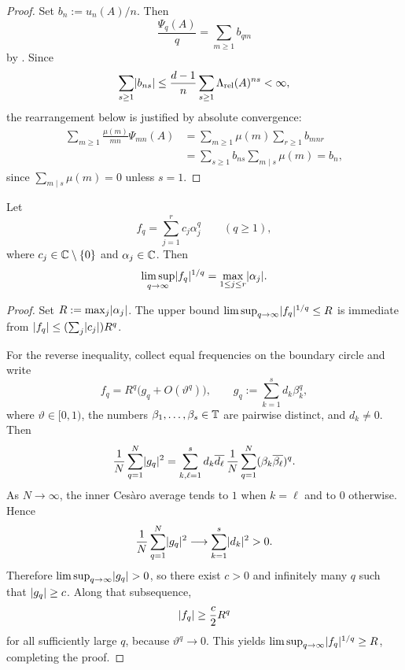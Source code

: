 \begin{proof}
  Set \(b_n:=u_n(A)/n\). Then
  \[
    \frac{\Psi_q(A)}{q}
    =\sum_{m\ge 1}b_{qm}
  \]
  by . Since
  \[
    \sum_{s\ge 1}\lvert b_{ns} \rvert
    \le \frac{d-1}{n}\sum_{s\ge 1}\Lambda_{\mathrm{rel}}(A)^{ns}
    <\infty,
  \]
  the rearrangement below is justified by absolute convergence:
  \begin{align*}
    \sum_{m\ge 1}\frac{\mu(m)}{mn}\Psi_{mn}(A)
    &=
    \sum_{m\ge 1}\mu(m)\sum_{r\ge 1}b_{mnr} \\
    &=
    \sum_{s\ge 1}b_{ns}\sum_{m\mid s}\mu(m)
    =b_n,
  \end{align*}
  since \(\sum_{m\mid s}\mu(m)=0\) unless \(s=1\).
\end{proof}

\begin{lemma}
  \label{lem:finite-part-exponential-sum-limsup}
  Let
  \[
    f_q=\sum_{j=1}^r c_j\alpha_j^q
    \qquad (q\ge 1),
  \]
  where \(c_j\in\mathbb{C}\setminus\{0\}\) and \(\alpha_j\in\mathbb{C}\). Then
  \[
    \limsup_{q\to\infty}\lvert f_q \rvert^{1/q}
    =\max_{1\le j\le r}\lvert \alpha_j \rvert.
  \]
\end{lemma}

\begin{proof}
  Set \(R:=\max_j\lvert \alpha_j \rvert\). The upper bound
  \(\limsup_{q\to\infty}\lvert f_q \rvert^{1/q}\le R\) is immediate from
  \(\lvert f_q \rvert\le (\sum_j\lvert c_j \rvert)R^q\).

  For the reverse inequality, collect equal frequencies on the boundary
  circle and write
  \[
    f_q
    =R^q\bigl(g_q+O(\vartheta^q)\bigr),
    \qquad
    g_q:=\sum_{k=1}^s d_k\beta_k^q,
  \]
  where \(\vartheta\in[0,1)\), the numbers \(\beta_1,\dots,\beta_s\in\mathbb{T}\)
  are pairwise distinct, and \(d_k\neq 0\). Then
  \[
    \frac{1}{N}\sum_{q=1}^N\lvert g_q \rvert^2
    =\sum_{k,\ell=1}^s d_k\overline{d_\ell}\,
      \frac{1}{N}\sum_{q=1}^N(\beta_k\overline{\beta_\ell})^q.
  \]
  As \(N\to\infty\), the inner Ces\`aro average tends to \(1\) when
  \(k=\ell\) and to \(0\) otherwise. Hence
  \[
    \frac{1}{N}\sum_{q=1}^N\lvert g_q \rvert^2
    \longrightarrow
    \sum_{k=1}^s\lvert d_k \rvert^2>0.
  \]
  Therefore \(\limsup_{q\to\infty}\lvert g_q \rvert>0\), so there exist
  \(c>0\) and infinitely many \(q\) such that \(\lvert g_q \rvert\ge c\). Along
  that subsequence,
  \[
    \lvert f_q \rvert\ge \frac{c}{2}R^q
  \]
  for all sufficiently large \(q\), because \(\vartheta^q\to 0\). This
  yields
  \(\limsup_{q\to\infty}\lvert f_q \rvert^{1/q}\ge R\), completing the proof.
\end{proof}

